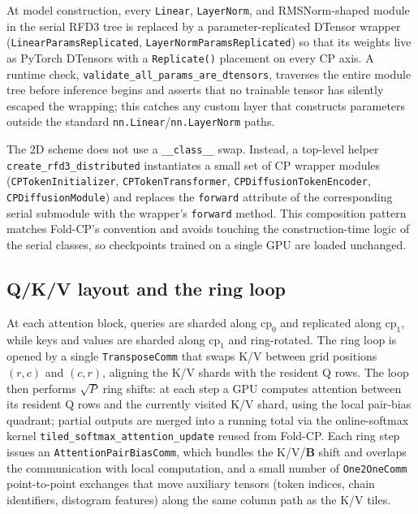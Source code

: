 \documentclass{article}
\theoremstyle{plain}
\theoremstyle{definition}
\theoremstyle{remark}
\begin{document}
At model construction, every \texttt{Linear}, \texttt{LayerNorm}, and RMSNorm-shaped module in the serial RFD3 tree is replaced by a parameter-replicated DTensor wrapper (\texttt{LinearParamsReplicated}, \texttt{LayerNormParamsReplicated}) so that its weights live as PyTorch DTensors with a \texttt{Replicate()} placement on every CP axis. A runtime check, \texttt{validate\_all\_params\_are\_dtensors}, traverses the entire module tree before inference begins and asserts that no trainable tensor has silently escaped the wrapping; this catches any custom layer that constructs parameters outside the standard \texttt{nn.Linear}/\texttt{nn.LayerNorm} paths.

The 2D scheme does not use a \texttt{\_\_class\_\_} swap. Instead, a top-level helper \texttt{create\_rfd3\_distributed} instantiates a small set of CP wrapper modules (\texttt{CPTokenInitializer}, \texttt{CPTokenTransformer}, \texttt{CPDiffusionTokenEncoder}, \texttt{CPDiffusionModule}) and replaces the \texttt{forward} attribute of the corresponding serial submodule with the wrapper's \texttt{forward} method. This composition pattern matches Fold-CP's convention and avoids touching the construction-time logic of the serial classes, so checkpoints trained on a single GPU are loaded unchanged.

\subsection{Q/K/V layout and the ring loop}
\label{app:2d-ring}

At each attention block, queries are sharded along $\text{cp}_0$ and replicated along $\text{cp}_1$, while keys and values are sharded along $\text{cp}_1$ and ring-rotated. The ring loop is opened by a single \texttt{TransposeComm} that swaps K/V between grid positions $(r,c)$ and $(c,r)$, aligning the K/V shards with the resident Q rows. The loop then performs $\sqrt{P}$ ring shifts: at each step a GPU computes attention between its resident Q rows and the currently visited K/V shard, using the local pair-bias quadrant; partial outputs are merged into a running total via the online-softmax kernel \texttt{tiled\_softmax\_attention\_update} reused from Fold-CP. Each ring step issues an \texttt{AttentionPairBiasComm}, which bundles the K/V/$\mathbf{B}$ shift and overlaps the communication with local computation, and a small number of \texttt{One2OneComm} point-to-point exchanges that move auxiliary tensors (token indices, chain identifiers, distogram features) along the same column path as the K/V tiles.
\end{document}

